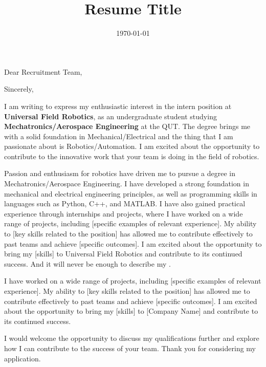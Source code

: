 \documentclass[11pt,a4paper,sans]{moderncv}        %
\title{Resume Title}                               %
\begin{document}
\date{\today}
\opening{Dear Recruitment Team,}
\closing{Sincerely,}
\makelettertitle

I am writing to express my enthusiastic interest in the intern position at \textbf{Universal Field Robotics}, 
as an undergraduate student studying \textbf{Mechatronics/Aerospace Engineering} at the QUT. The degree brings me with a solid foundation in Mechanical/Electrical 
and the thing that I am passionate about is Robotics/Automation. I am excited about the opportunity to contribute to the innovative work that your team is doing in the field of robotics.

Passion and enthusiasm for robotics have driven me to pursue a degree in Mechatronics/Aerospace Engineering. I have developed a strong foundation in mechanical and electrical engineering principles, as well as programming skills in languages such as Python, C++, and MATLAB. I have also gained practical experience through internships and projects, where I have worked on a wide range of projects, including [specific examples of relevant experience]. My ability to [key skills related to the position] has allowed me to contribute effectively to past teams and achieve [specific outcomes]. I am excited about the opportunity to bring my [skills] to Universal Field Robotics and contribute to its continued success. 
And it will never be enough to describe my .


I have worked on a wide range of projects, including [specific examples of relevant experience]. 
My ability to [key skills related to the position] has allowed me to contribute effectively to past teams and achieve [specific outcomes]. 
I am excited about the opportunity to bring my [skills] to [Company Name] and contribute to its continued success.

I would welcome the opportunity to discuss my qualifications further and explore how I can contribute to the success of your team. Thank you for considering my application.

\makeletterclosing
\end{document}
